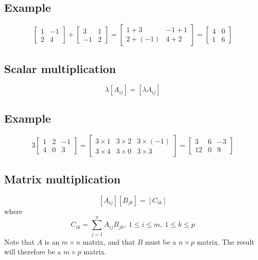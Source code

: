 \documentclass[11pt]{article}
\begin{document}
\subsection{Example}
\[ 
\begin{bmatrix}
1 & -1 \\
2 & 4
\end{bmatrix}
+ \begin{bmatrix}
3 & 1 \\
-1 & 2
\end{bmatrix}
= \begin{bmatrix}
1 + 3 & -1 + 1 \\
2 + (-1) & 4 + 2
\end{bmatrix}
= \begin{bmatrix}
4 & 0 \\
1 & 6
\end{bmatrix}
\]

\subsection{Scalar multiplication}
\[ \lambda [A_{ij}] = [\lambda A_{ij}] \]

\subsection{Example}
\[
3 \begin{bmatrix}
1 & 2 & -1 \\
4 & 0 & 3
\end{bmatrix}
= \begin{bmatrix}
3 \times 1 & 3 \times 2 & 3 \times (-1) \\
3 \times 4 & 3 \times 0 & 3 \times 3
\end{bmatrix}
= \begin{bmatrix}
3 & 6 & -3 \\
12 & 0 & 9
\end{bmatrix}
\]

\subsection{Matrix multiplication}
\[ [A_{ij}] [B_{jk}] = [C_{ik}] \]
where
\[ C_{ik} = \sum_{j=1}^n A_{ij}B_{jk},\ 1 \leq i \leq m,\ 1 \leq k \leq p \]
Note that $A$ is an $m \times n$ matrix, and that $B$ must be a $n \times p$ matrix. The result will therefore be a $m \times p$ matrix.
\end{document}
